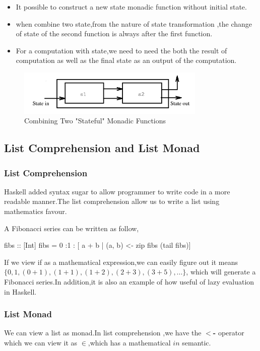 \begin{itemize}
\item It possible to construct a new state monadic function without initial state.
\item when combine two state,from the nature of state transformation ,the change of state of  the second function is always after the first function.
\item For a computation with state,we need to need the both the result of computation as well as the final state as an output of the computation.
\end{itemize}

\begin{figure}[H]
  \centering
	\includegraphics[width=0.80\textwidth]{pic/c3/state_monad.png}
	\caption{Combining Two "Stateful" Monadic Functions}
\end{figure}


\subsection{List Comprehension and List Monad}
\subsubsection{List Comprehension}
Haskell added syntax sugar to allow programmer to write code in a more readable manner.The list comprehension allow us to write a list using mathematics favour.

A Fibonacci series can be written as follow,
\begin{hcode}
fibs :: [Int]
fibs = 0 :1 : [ a + b | (a, b) <- zip fibs (tail fibs)]
\end{hcode}

If we view if as a mathematical expression,we can easily figure out it means $ \lbrace  0,1 ,(0+1),(1+1),(1+2),(2+3),(3+5),... \rbrace $, which will generate a Fibonacci series.In addition,it is also an example of how useful of lazy evaluation in Haskell.

\subsubsection{List Monad}
We can view a list as monad.In list comprehension ,we have the \textbf{$<$-} operator which we can view it as $\in$,which has a mathematical $ in$  semantic.\\

